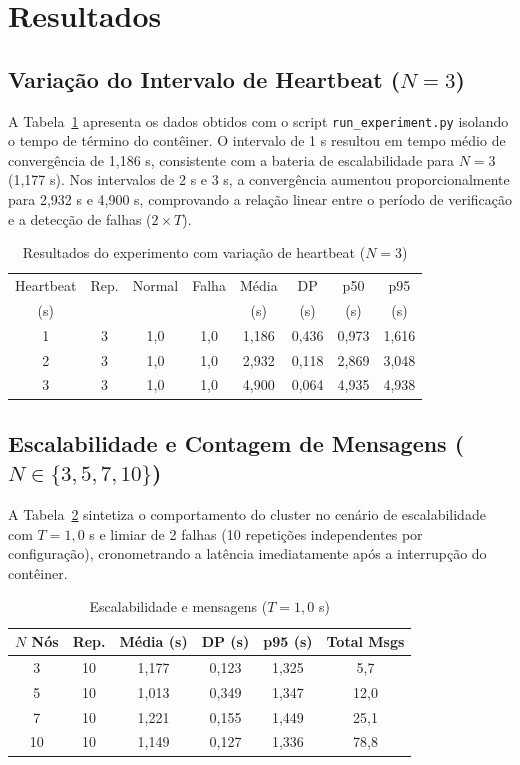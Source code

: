 \section{Resultados}
\label{sec:resultados}

\subsection{Variação do Intervalo de Heartbeat (\texorpdfstring{$N=3$}{N=3})}
A Tabela~\ref{tab:resultados_hbeat} apresenta os dados obtidos com o script
\texttt{run\_experiment.py} isolando o tempo de término do contêiner. O intervalo
de 1 s resultou em tempo médio de convergência de 1,186 s, consistente com a
bateria de escalabilidade para $N=3$ (1,177 s). Nos intervalos de 2 s e 3 s, a
convergência aumentou proporcionalmente para 2,932 s e 4,900 s, comprovando a
relação linear entre o período de verificação e a detecção de falhas ($2 \times T$).

\begin{table}[!t]
\centering
\setlength{\tabcolsep}{3.2pt}
\caption{Resultados do experimento com variação de heartbeat ($N=3$)}
\label{tab:resultados_hbeat}
\begin{tabular}{c c c c c c c c}
\toprule
Heartbeat & Rep. & Normal & Falha & Média & DP & p50 & p95 \\
(s) & & & & (s) & (s) & (s) & (s) \\
\midrule
1 & 3 & 1,0 & 1,0 & 1,186 & 0,436 & 0,973 & 1,616 \\
2 & 3 & 1,0 & 1,0 & 2,932 & 0,118 & 2,869 & 3,048 \\
3 & 3 & 1,0 & 1,0 & 4,900 & 0,064 & 4,935 & 4,938 \\
\bottomrule
\end{tabular}
\end{table}

\subsection{Escalabilidade e Contagem de Mensagens (\texorpdfstring{$N \in \{3, 5, 7, 10\}$}{N in {3, 5, 7, 10}})}
A Tabela~\ref{tab:resultados_bateria} sintetiza o comportamento do cluster no
cenário de escalabilidade com $T=1{,}0$ s e limiar de 2 falhas (10 repetições
independentes por configuração), cronometrando a latência imediatamente após a
interrupção do contêiner.

\begin{table}[!t]
\centering
\caption{Escalabilidade e mensagens ($T=1{,}0$ s)}
\label{tab:resultados_bateria}
\begin{tabular}{c c c c c c}
\toprule
$N$ Nós & Rep. & Média (s) & DP (s) & p95 (s) & Total Msgs \\
\midrule
3  & 10 & 1,177 & 0,123 & 1,325 & 5,7  \\
5  & 10 & 1,013 & 0,349 & 1,347 & 12,0 \\
7  & 10 & 1,221 & 0,155 & 1,449 & 25,1 \\
10 & 10 & 1,149 & 0,127 & 1,336 & 78,8 \\
\bottomrule
\end{tabular}
\end{table}

